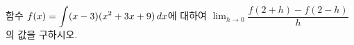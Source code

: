 함수 $f(x)=\displaystyle\int (x-3)(x^2+3x+9)\mkern3mu dx$에 대하여 $\displaystyle\lim_{h\to 0}\dfrac{f(2+h)-f(2-h)}{h}$의 값을 구하시오.
